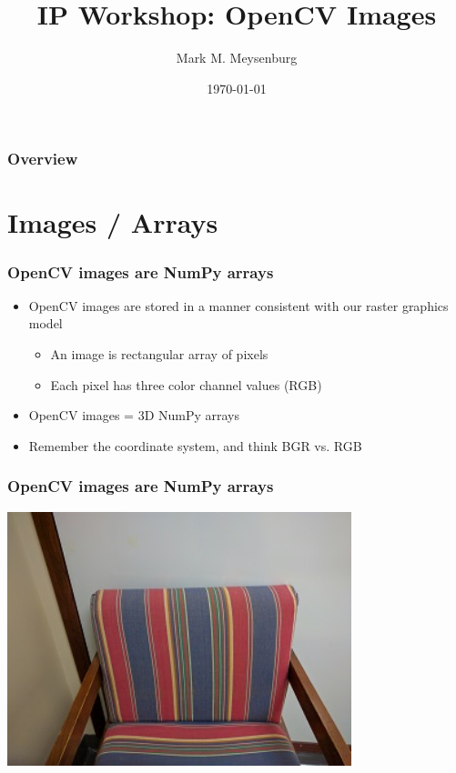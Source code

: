 \documentclass{beamer}
\title[Image Basics]{IP Workshop: OpenCV Images} %
\author{Mark M. Meysenburg} %
\institute[Doane DIVAS] %
{
Doane University \\ %
\medskip
\textit{mark.meysenburg@doane.edu} %
}
\date{\today} %
\begin{document}
\lstset{basicstyle=\footnotesize,language=Python}

\begin{frame}
\titlepage %
\end{frame}

\begin{frame}
\frametitle{Overview} 
\tableofcontents 
\end{frame}


\section{Images / Arrays}

\begin{frame}
	\frametitle{OpenCV images are NumPy arrays}

	\begin{itemize}

		\item OpenCV images are stored in a manner consistent with our raster graphics model

		\begin{itemize}

			\item An image is rectangular array of pixels

			\item Each pixel has three color channel values (RGB)

		\end{itemize}

		\item OpenCV images = 3D NumPy arrays

		\item Remember the coordinate system, and think BGR vs. RGB
	\end{itemize}

\end{frame}

\begin{frame}
	\frametitle{OpenCV images are NumPy arrays}

	\begin{center}
		\includegraphics[width=0.75\textwidth]{../../fig/02-chair-orig.jpg}
	\end{center}

\end{frame}
\end{document}
